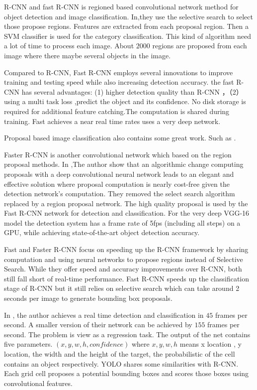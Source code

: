 \documentclass[10pt,twocolumn,letterpaper]{article}
\begin{document}
R-CNN and fast R-CNN is regioned based convolutional network method for object detection and image classification. In\cite{DSDFGVFB},they use the selective search to select those propose regions. Features are extracted from each proposal region. Then a SVM classifier is used for the category classification. This kind of algorithm need a  lot of time to process each image.  About $2000$ regions are proposed from each image where there maybe several objects in the image. 


Compared to R-CNN\cite{DSDFGVFB}, Fast R-CNN\cite{girshick2015fast} employs several innovations to improve training and testing speed while also increasing detection accuracy. the fast R-CNN has several advantages: (1) higher detection quality  than  R-CNN ，（2） using  a multi task loss ,predict the object and its confidence. No disk storage is required for additional feature catching.The computation is shared during training. Fast achieves a near real time rates uses a very deep network.

Proposal based image classification also contains some great work. Such as \cite{ren2017faster}\cite{redmon2016you}\cite{Redmon2016YOLO9000}\cite{yolov3}.



Faster R-CNN\cite{ren2017faster} is another convolutional network which based on the region proposal methods. In \cite{ren2017faster},The author show that an algorithmic change computing proposals with a deep convolutional neural network leads to an elegant and effective solution where proposal computation is nearly cost-free given the detection network’s computation. They removed the select search algorithm replaced by a region proposal network.
The high quality proposal is used by the Fast R-CNN network for detection and classification. For the very deep VGG-16 model the detection system has a frame rate of 5fps (including all steps) on a GPU, while achieving state-of-the-art object detection accuracy.


Fast and Faster R-CNN focus on speeding up the R-CNN framework by sharing computation and using neural networks to propose regions instead
of Selective Search. While they offer speed and accuracy improvements over R-CNN, both still fall short of real-time performance.
Fast R-CNN speeds up the classification stage of R-CNN but it still relies on selective search which can take around 2 seconds per image to generate bounding box proposals.


In \cite{redmon2016you}, the author achieves a real time detection and classification in $45$  frames per second. A smaller version of their network can be achieved by $ 155$ frames per second. The problem is view as a regression task. The output of the net contains five parameters. $(x,y,w,h,confidence)$ where $x,y,w,h$ means x location , y  location, the width and the height of the target, the probabilistic of the cell contains an object respectively. YOLO shares some similarities with R-CNN. Each grid
cell proposes a potential bounding boxes and scores those boxes using convolutional features.
\end{document}
